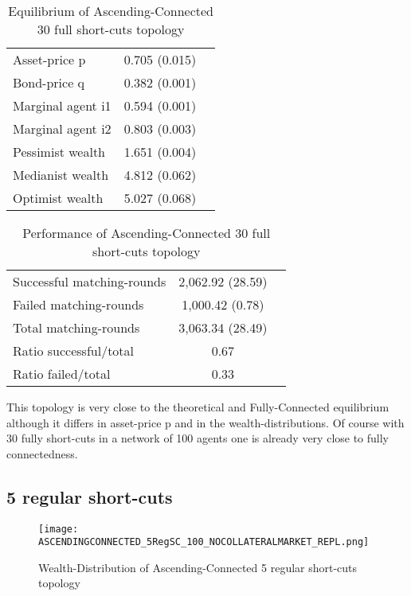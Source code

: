 \documentclass[Bachelorarbeit.tex]{subfiles}
\begin{document}
\begin{table}[H]
	\caption{Equilibrium of Ascending-Connected 30 full short-cuts topology}
	\centering
	\begin{tabular} { l c r }
		\hline
		Asset-price p & 0.705 (0.015) \\
		Bond-price q & 0.382 (0.001) \\
		Marginal agent i1 & 0.594 (0.001) \\
		Marginal agent i2 & 0.803 (0.003) \\
		\hline
		Pessimist wealth & 1.651 (0.004) \\
		Medianist wealth & 4.812 (0.062) \\
		Optimist wealth & 5.027 (0.068) \\
		\hline
	\end{tabular}
\end{table} 

\begin{table}[H]
	\caption{Performance of Ascending-Connected 30 full short-cuts topology}
	\centering
	\begin{tabular} { l c r }
		\hline
		Successful matching-rounds & 2,062.92 (28.59) \\
		Failed matching-rounds & 1,000.42 (0.78) \\
		Total matching-rounds & 3,063.34 (28.49) \\
		\hline
		Ratio successful/total & 0.67 \\
		Ratio failed/total & 0.33 \\
		\hline
	\end{tabular}
\end{table}

This topology is very close to the theoretical and Fully-Connected equilibrium although it differs in asset-price p and in the wealth-distributions. Of course with 30 fully short-cuts in a network of 100 agents one is already very close to fully connectedness.

\subsection{5 regular short-cuts}
\begin{figure}[H]
	\centering
  \texttt{[image: ASCENDINGCONNECTED\_5RegSC\_100\_NOCOLLATERALMARKET\_REPL.png]}
	\caption{Wealth-Distribution of Ascending-Connected 5 regular short-cuts topology}
	\label{fig:wealth_ASCENDINGCONNECTED_5RegSC_100_NOCOLLATERALMARKET_REPL}
\end{figure}
\end{document}
